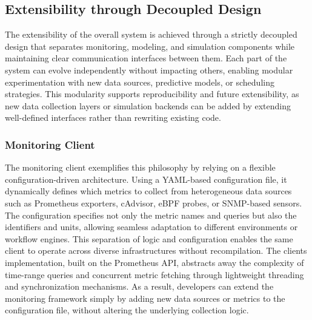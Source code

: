 \begin{table}[H]
{\begin{tabular}{
            p{4.5cm}
            >{\centering\arraybackslash}p{2.8cm}
            p{8.2cm}
            }
            \bottomrule
        \end{tabular}
    }
\end{table}


\subsection{Extensibility through Decoupled Design}
\label{sec:extensibility_through_decoupled_design}
The extensibility of the overall system is achieved through a strictly decoupled design that separates monitoring, modeling, and simulation components while maintaining clear communication interfaces between them. Each part of the system can evolve independently without impacting others, enabling modular experimentation with new data sources, predictive models, or scheduling strategies. This modularity supports reproducibility and future extensibility, as new data collection layers or simulation backends can be added by extending well-defined interfaces rather than rewriting existing code.
\subsubsection{Monitoring Client}
\label{sec:monitoring_client}
The monitoring client exemplifies this philosophy by relying on a flexible configuration-driven architecture. Using a YAML-based configuration file, it dynamically defines which metrics to collect from heterogeneous data sources such as Prometheus exporters, cAdvisor, eBPF probes, or SNMP-based sensors. The configuration specifies not only the metric names and queries but also the identifiers and units, allowing seamless adaptation to different environments or workflow engines. This separation of logic and configuration enables the same client to operate across diverse infrastructures without recompilation. The clients implementation, built on the Prometheus API, abstracts away the complexity of time-range queries and concurrent metric fetching through lightweight threading and synchronization mechanisms. As a result, developers can extend the monitoring framework simply by adding new data sources or metrics to the configuration file, without altering the underlying collection logic.


